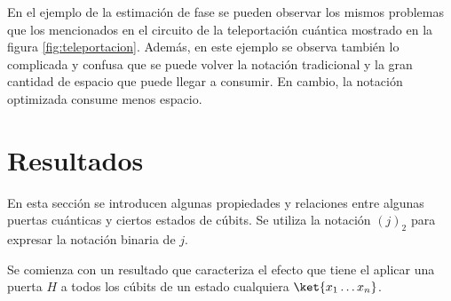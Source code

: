 \documentclass[10pt,conference,a4paper]{IEEEtran}
\begin{document}
En el ejemplo de la estimación de fase se pueden observar los mismos problemas que los mencionados en el circuito de la teleportación cuántica  mostrado en la figura \ref{fig:teleportacion}. Además, en este ejemplo se observa también lo complicada y confusa que se puede volver la notación tradicional y la gran cantidad de espacio que puede llegar a consumir. En cambio, la  notación  optimizada consume menos espacio.%

\section{Resultados}
\label{seccion:5}
En esta sección se introducen algunas propiedades y relaciones entre algunas puertas cuánticas y ciertos estados de cúbits. Se utiliza  la notación $(j)_2$ para expresar la notación binaria de $j$.%

Se comienza con un resultado que caracteriza el efecto que tiene el aplicar una puerta $H$ a todos los cúbits de un estado cualquiera $\ket{x_{1}\ldots x_{n}}$.
\end{document}
